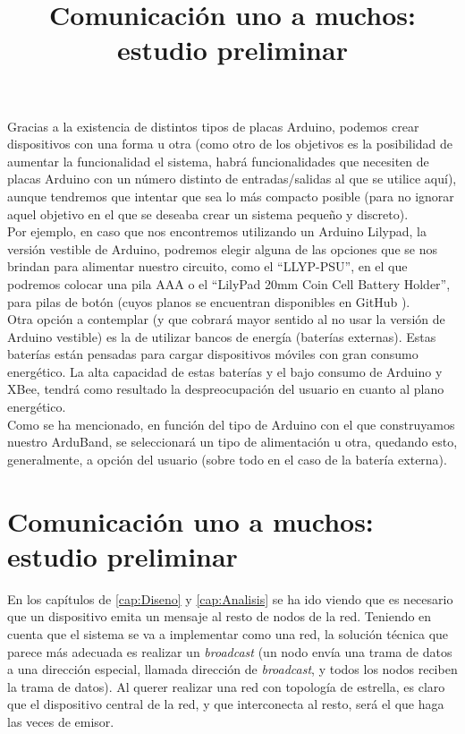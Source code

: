 Gracias a la existencia de distintos tipos de placas Arduino, podemos crear dispositivos
con una forma u otra (como otro de los objetivos es la posibilidad de aumentar la funcionalidad
el sistema, habrá funcionalidades que necesiten de placas Arduino con un número distinto de
entradas/salidas al que se utilice aquí), aunque tendremos que intentar que sea lo más compacto
posible (para no ignorar aquel objetivo en el que se deseaba crear un sistema pequeño y discreto).\\

Por ejemplo, en caso que nos encontremos utilizando un Arduino Lilypad, la versión vestible de Arduino,
podremos elegir alguna de las opciones que se nos brindan para alimentar nuestro circuito, como el “LLYP-PSU”,
en el que podremos colocar una pila AAA o el “LilyPad 20mm Coin Cell Battery Holder”, para pilas de botón (cuyos
planos se encuentran disponibles en GitHub \cite{lilypadcoin}).\\

Otra opción a contemplar (y que cobrará mayor sentido al no usar la versión de Arduino vestible)
es la de utilizar bancos de energía (baterías externas). Estas baterías están pensadas para cargar
dispositivos móviles con gran consumo energético. La alta capacidad de estas baterías y el bajo consumo
de Arduino y XBee, tendrá como resultado la despreocupación del usuario en cuanto al plano energético.\\

Como se ha mencionado, en función del tipo de Arduino con el que construyamos nuestro ArduBand,
se seleccionará un tipo de alimentación u otra, quedando esto, generalmente, a opción del usuario
(sobre todo en el caso de la batería externa).\\

\section{Comunicación uno a muchos: estudio preliminar}
\title{Comunicación uno a muchos: estudio preliminar}

En los capítulos de \ref{cap:Diseno} y \ref{cap:Analisis} se ha ido viendo que es necesario
que un dispositivo emita un mensaje al resto de nodos de la red. Teniendo en cuenta que el
sistema se va a implementar como una red, la solución técnica que parece más adecuada
es realizar un \textit{broadcast} (un nodo envía una trama de datos a una dirección
especial, llamada dirección de \textit{broadcast}, y todos los nodos reciben la trama de datos). Al querer
realizar una red con topología de estrella, es claro que el dispositivo central de
la red, y que interconecta al resto, será el que haga las veces de emisor.\\

